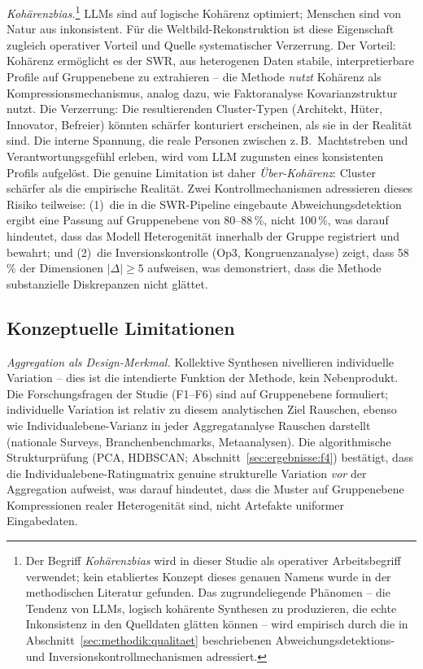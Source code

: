 \documentclass[12pt,a4paper]{article}
\begin{document}
\emph{Kohärenzbias.}\footnote{Der Begriff \emph{Kohärenzbias} wird in dieser Studie als operativer Arbeitsbegriff verwendet; kein etabliertes Konzept dieses genauen Namens wurde in der methodischen Literatur gefunden. Das zugrundeliegende Phänomen -- die Tendenz von LLMs, logisch kohärente Synthesen zu produzieren, die echte Inkonsistenz in den Quelldaten glätten können -- wird empirisch durch die in Abschnitt~\ref{sec:methodik:qualitaet} beschriebenen Abweichungsdetektions- und Inversionskontrollmechanismen adressiert.} LLMs sind auf logische Kohärenz optimiert; Menschen sind von Natur aus inkonsistent. Für die Weltbild-Rekonstruktion ist diese Eigenschaft zugleich operativer Vorteil und Quelle systematischer Verzerrung. Der Vorteil: Kohärenz ermöglicht es der SWR, aus heterogenen Daten stabile, interpretierbare Profile auf Gruppenebene zu extrahieren -- die Methode \emph{nutzt} Kohärenz als Kompressionsmechanismus, analog dazu, wie Faktoranalyse Kovarianzstruktur nutzt. Die Verzerrung: Die resultierenden Cluster-Typen (Architekt, Hüter, Innovator, Befreier) könnten schärfer konturiert erscheinen, als sie in der Realität sind. Die interne Spannung, die reale Personen zwischen z.\,B.\ Machtstreben und Verantwortungsgefühl erleben, wird vom LLM zugunsten eines konsistenten Profils aufgelöst. Die genuine Limitation ist daher \emph{Über-Kohärenz}: Cluster schärfer als die empirische Realität. Zwei Kontrollmechanismen adressieren dieses Risiko teilweise: (1)~die in die SWR-Pipeline eingebaute Abweichungsdetektion ergibt eine Passung auf Gruppenebene von 80--88\,\%, nicht 100\,\%, was darauf hindeutet, dass das Modell Heterogenität innerhalb der Gruppe registriert und bewahrt; und (2)~die Inversionskontrolle (Op3, Kongruenzanalyse) zeigt, dass 58\,\% der Dimensionen $|\Delta| \geq 5$ aufweisen, was demonstriert, dass die Methode substanzielle Diskrepanzen nicht glättet.


\subsection{Konzeptuelle Limitationen}

\emph{Aggregation als Design-Merkmal.} Kollektive Synthesen nivellieren individuelle Variation -- dies ist die intendierte Funktion der Methode, kein Nebenprodukt. Die Forschungsfragen der Studie (F1--F6) sind auf Gruppenebene formuliert; individuelle Variation ist relativ zu diesem analytischen Ziel Rauschen, ebenso wie Individualebene-Varianz in jeder Aggregatanalyse Rauschen darstellt (nationale Surveys, Branchenbenchmarks, Metaanalysen). Die algorithmische Strukturprüfung (PCA, HDBSCAN; Abschnitt~\ref{sec:ergebnisse:f4}) bestätigt, dass die Individualebene-Ratingmatrix genuine strukturelle Variation \emph{vor} der Aggregation aufweist, was darauf hindeutet, dass die Muster auf Gruppenebene Kompressionen realer Heterogenität sind, nicht Artefakte uniformer Eingabedaten.
\end{document}
